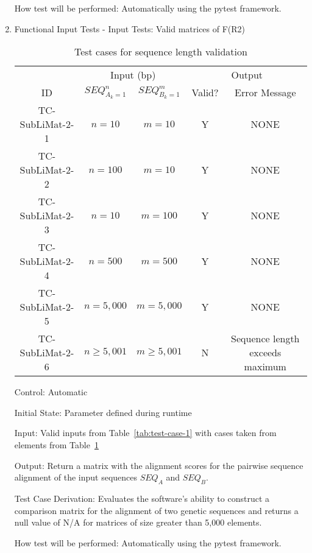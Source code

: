 \documentclass[12pt, titlepage]{article}
\begin{document}
\begin{enumerate}

How test will be performed: Automatically using the pytest framework.
					


\item{Functional Input Tests - Input Tests: Valid matrices of F(R2)\\}
\begin{table}[h]
  \begin{tabular}{|c|c c|c c|}
  \hline 
    & \multicolumn{2}{c|}{Input (bp)} & \multicolumn{2}{c|}{Output} \\
  \cline{2-5}
  ID & $SEQ_{A_k=1}^n$ & $SEQ_{B_k=1}^m$ & Valid? & Error Message \\
  \hline
  TC-SubLiMat-2-1 & $n=10$ & $m=10$ & Y & NONE \\
  \hline
  TC-SubLiMat-2-2 & $n=100$ & $m=10$ & Y & NONE \\
  \hline
  TC-SubLiMat-2-3 & $n=10$ & $m=100$ & Y & NONE \\
  \hline
  TC-SubLiMat-2-4 & $n=500$ & $m=500$ & Y & NONE \\
  \hline
  TC-SubLiMat-2-5 & $n=5,000$ & $m=5,000$ & Y & NONE \\
  \hline
  TC-SubLiMat-2-6 & $n \geq 5,001$ & $m \geq 5,001$ & N & Sequence length exceeds maximum \\
  \hline
  \end{tabular}
  \caption{Test cases for sequence length validation}
  \label{tab:test-case-2}
 \end{table}

Control: Automatic
					
Initial State: Parameter defined during runtime
					
Input: Valid inputs from Table~\ref{tab:test-case-1} with cases taken from elements from 
Table~\ref{tab:test-case-2}

					
Output: Return a matrix with the alignment scores for the pairwise sequence alignment of the input sequences
 $SEQ_A$ and $SEQ_B$. 

Test Case Derivation: Evaluates the software's ability to construct a comparison matrix for the alignment of 
two genetic sequences and returns a null value of N/A for matrices of size greater than 5,000 elements.

How test will be performed: Automatically using the pytest framework.


\end{enumerate}
\end{document}

